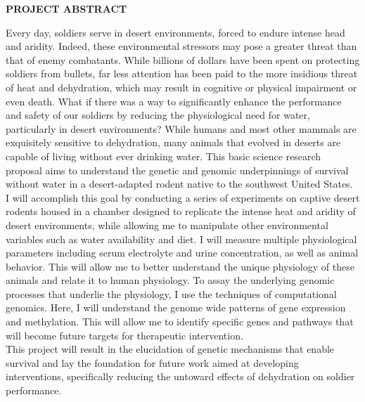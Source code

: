 \documentclass[12pt]{article}
\begin{document}

\setcounter{page}{1}

\begin{center}

 \textbf{PROJECT ABSTRACT} \\

\textsc{}

\end{center}


Every day, soldiers serve in desert environments, forced to endure intense head and aridity. Indeed, these environmental stressors may pose a greater threat than that of enemy combatants. While billions of dollars have been spent on protecting soldiers from bullets, far less attention has been paid to the more insidious threat of heat and dehydration, which may result in cognitive or physical impairment or even death. What if there was a way to significantly enhance the performance and safety of our soldiers by reducing the physiological need for water, particularly in desert environments? While humans and most other mammals are exquisitely sensitive to dehydration, many animals that evolved in deserts are capable of living without ever drinking water. This basic science research proposal aims to understand the genetic and genomic underpinnings of survival without water in a desert-adapted rodent native to the southwest United States. \\



I will accomplish this goal by conducting a series of experiments on captive desert rodents housed in a chamber designed to replicate the intense heat and aridity of desert environments, while allowing me to manipulate other environmental variables such as water availability and diet. I will measure multiple physiological parameters including serum electrolyte and urine concentration, as well as animal behavior. This will allow me to better understand the unique physiology of these animals and relate it to human physiology. To assay the underlying genomic processes that underlie the physiology, I use the techniques of computational genomics. Here, I will understand the genome wide patterns of gene expression and methylation. This will allow me to identify specific genes and pathways that will become future targets for therapeutic intervention.   \\  

This project will result in the elucidation of genetic mechanisms that enable survival and lay the foundation for future work aimed at developing interventions, specifically reducing the untoward effects of dehydration on soldier performance.  \\


   
\end{document}
